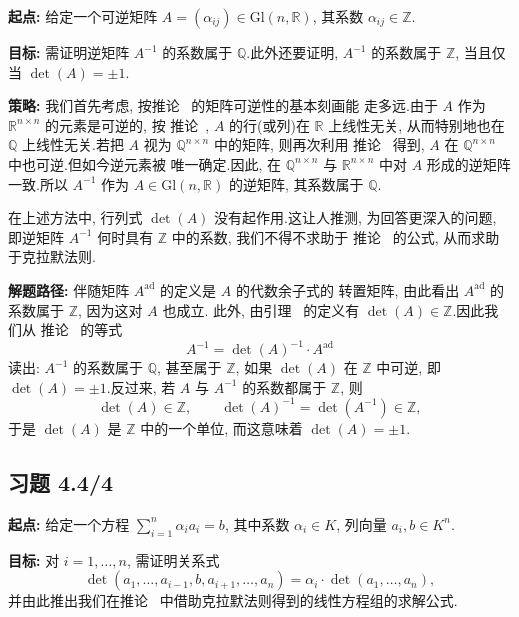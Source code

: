 \noindent\textbf{起点:} 给定一个可逆矩阵 $A = (\alpha_{ij}) \in \mathrm{Gl}(n,
\mathbb{R})$, 其系数 $\alpha_{ij} \in \mathbb{Z}$.

\noindent\textbf{目标:} 需证明逆矩阵 $A^{-1}$ 的系数属于 $\mathbb{Q}$.此外还要证明,
$A^{-1}$ 的系数属于 $\mathbb{Z}$, 当且仅当 $\det(A) = \pm 1$.

\noindent\textbf{策略:} 我们首先考虑, 按推论~ 的矩阵可逆性的基本刻画能
走多远.由于 $A$ 作为 $\mathbb{R}^{n \times n}$ 的元素是可逆的, 按
推论~, $A$ 的行(或列)在 $\mathbb{R}$ 上线性无关, 从而特别地也在
$\mathbb{Q}$ 上线性无关.若把 $A$ 视为 $\mathbb{Q}^{n \times n}$ 中的矩阵, 则再次利用
推论~ 得到, $A$ 在 $\mathbb{Q}^{n \times n}$ 中也可逆.但如今逆元素被
唯一确定.因此, 在 $\mathbb{Q}^{n \times n}$ 与 $\mathbb{R}^{n \times n}$ 中对 $A$
形成的逆矩阵一致.所以 $A^{-1}$ 作为 $A \in \mathrm{Gl}(n, \mathbb{R})$ 的逆矩阵,
其系数属于 $\mathbb{Q}$.

在上述方法中, 行列式 $\det(A)$ 没有起作用.这让人推测, 为回答更深入的问题, 即逆矩阵
$A^{-1}$ 何时具有 $\mathbb{Z}$ 中的系数, 我们不得不求助于
推论~ 的公式, 从而求助于克拉默法则.

\noindent\textbf{解题路径:} 伴随矩阵 $A^{\mathrm{ad}}$ 的定义是 $A$ 的代数余子式的
转置矩阵, 由此看出 $A^{\mathrm{ad}}$ 的系数属于 $\mathbb{Z}$, 因为这对 $A$ 也成立.
此外, 由引理~ 的定义有 $\det(A) \in \mathbb{Z}$.因此我们从
推论~ 的等式
\[
A^{-1} = \det(A)^{-1} \cdot A^{\mathrm{ad}}
\]
读出: $A^{-1}$ 的系数属于 $\mathbb{Q}$, 甚至属于 $\mathbb{Z}$, 如果 $\det(A)$ 在
$\mathbb{Z}$ 中可逆, 即 $\det(A) = \pm 1$.反过来, 若 $A$ 与 $A^{-1}$ 的系数都属于
$\mathbb{Z}$, 则
\[
\det(A) \in \mathbb{Z}, \qquad \det(A)^{-1} = \det(A^{-1}) \in \mathbb{Z},
\]
于是 $\det(A)$ 是 $\mathbb{Z}$ 中的一个单位, 而这意味着 $\det(A) = \pm 1$.

\subsection*{习题 4.4/4}

\noindent\textbf{起点:} 给定一个方程 $\sum_{i=1}^{n} \alpha_i a_i = b$, 其中系数
$\alpha_i \in K$, 列向量 $a_i, b \in K^n$.

\noindent\textbf{目标:} 对 $i = 1, \ldots, n$, 需证明关系式
\[
\det(a_1, \ldots, a_{i-1}, b, a_{i+1}, \ldots, a_n) = \alpha_i \cdot \det(a_1, \ldots, a_n),
\]
并由此推出我们在推论~ 中借助克拉默法则得到的线性方程组的求解公式.

